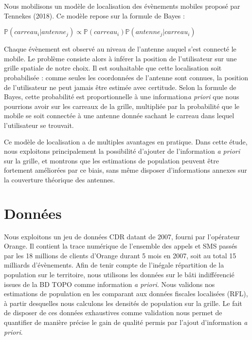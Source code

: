 \documentclass[12pt]{article}
\begin{document}
Nous mobilisons un modèle de localisation des évènements mobiles proposé par Tennekes (2018). Ce modèle repose sur la formule de Bayes :

\begin{center}
\begingroup
\large
$\mathbb{P}(carreau_i | antenne_j) \propto \mathbb{P}(carreau_i) \mathbb{P}(antenne_j | carreau_i)$
\endgroup
\end{center}

Chaque évènement est observé au niveau de l'antenne auquel s'est connecté le mobile. Le problème consiste alors à inférer la position de l'utilisateur sur une grille spatiale de notre choix. Il est souhaitable que cette localisation soit probabilisée : comme seules les coordonnées de l'antenne sont connues, la position de l'utilisateur ne peut jamais être estimée avec certitude. Selon la formule de Bayes, cette probabilité est proportionnelle à une information\textit{a priori} que nous pourrions avoir sur les carreaux de la grille, multipliée par la probabilité que le mobile se soit connectée à une antenne donnée sachant le carreau dans lequel l'utilisateur se trouvait.

Ce modèle de localisation a de multiples avantages en pratique. Dans cette étude, nous exploitons principalement la possibilité d'ajouter de l'information \textit{a priori} sur la grille, et montrons que les estimations de population peuvent être fortement améliorées par ce biais, sans même disposer d'informations annexes sur la couverture théorique des antennes.

\section{Données}

Nous exploitons un jeu de données CDR datant de 2007, fourni par l'opérateur Orange. Il contient la trace numérique de l'ensemble des appels et SMS passés par les 18 millions de clients d'Orange durant 5 mois en 2007, soit au total 15 milliards d'évènements. Afin de tenir compte de l'inégale répartition de la population sur le territoire, nous utilisons les données sur le bâti indifférencié issues de la BD TOPO comme information \textit{a priori}. Nous validons nos estimations de population en les comparant aux données fiscales localisées (RFL), à partir desquelles nous calculons les densités de population sur la grille. Le fait de disposer de ces données exhaustives comme validation nous permet de quantifier de manière précise le gain de qualité permis par l'ajout d'information \textit{a priori}.
\end{document}
